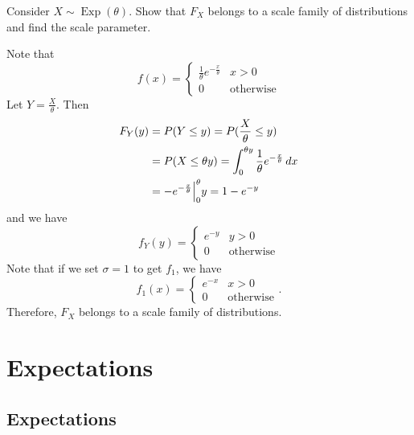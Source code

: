 \documentclass[notoc,notitlepage]{tufte-book}
\DeclareMathOperator{\Exp}{Exp }
\begin{document}
\begin{eg}[Example 2.15]\label{eg:3_3_3}
  Consider $X \sim \Exp(\theta)$. Show that $F_X$ belongs to a scale family of distributions and find the scale parameter.

  Note that
  \begin{equation*}
    f(x) = \begin{cases}
      \frac{1}{\theta} e^{- \frac{x}{\theta}} & x > 0 \\
      0                                       & \text{otherwise}
    \end{cases}
  \end{equation*}
  Let $Y = \frac{X}{\theta}$. Then
  \begin{align*}
    F_Y (y) &= P(Y \leq y) = P(\frac{X}{\theta} \leq y) \\
            &= P(X \leq \theta y) = \int_{0}^{\theta y} \frac{1}{\theta} e^{-\frac{x}{\theta}} \mathop{}\!d{x} \\
            &= - e^{- \frac{x}{\theta}} \Big|_{0}^{\theta}{y} = 1 - e^{-y}
  \end{align*}
  and we have
  \begin{equation*}
    f_Y(y) = \begin{cases}
      e^{-y} & y > 0 \\
      0      & \text{otherwise}
    \end{cases}
  \end{equation*}
  Note that if we set $\sigma = 1$ to get $f_1$, we have
  \begin{equation*}
    f_1(x) = \begin{cases}
      e^{-x} & x > 0 \\
      0      & \text{otherwise}
    \end{cases}.
  \end{equation*}
  Therefore, $F_X$ belongs to a scale family of distributions.
\end{eg}


\section{Expectations}%
\label{sec:expectations}

\subsection{Expectations}%
\label{sub:expectations}
\end{document}
